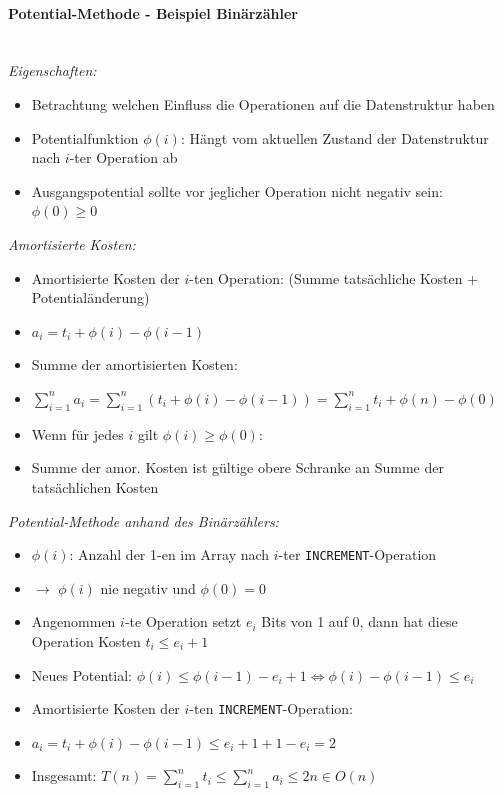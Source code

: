 \documentclass[
    ngerman,
    color=3b,
    dark_mode,
    load_common, %
    summary,
    boxarc,
]{tuda_summary}
\begin{document}
\pagebreak

\paragraph{Potential-Methode - Beispiel Binärzähler}\mbox{}\vspace{1em}\\

\textit{Eigenschaften:}
\begin{itemize}
    \item Betrachtung welchen Einfluss die Operationen auf die Datenstruktur haben
    \item Potentialfunktion $\phi(i)$: Hängt vom aktuellen Zustand der Datenstruktur nach $i$-ter Operation ab
    \item Ausgangspotential sollte vor jeglicher Operation nicht negativ sein: $\phi(0) \geq 0$
\end{itemize}

\textit{Amortisierte Kosten:}
\begin{itemize}
    \item Amortisierte Kosten der $i$-ten Operation: (Summe tatsächliche Kosten + Potentialänderung)
    \item[] $a_i = t_i + \phi(i) - \phi(i-1)$
    \item Summe der amortisierten Kosten:
    \item[] $\sum^n_{i=1} a_i = \sum^n_{i=1} (t_i + \phi(i) - \phi(i - 1)) = \sum^n_{i=1} t_i + \phi(n) - \phi(0)$
    \item Wenn für jedes $i$ gilt $\phi(i) \geq \phi(0)$:
    \item[] Summe der amor. Kosten ist gültige obere Schranke an Summe der tatsächlichen Kosten
\end{itemize}

\textit{Potential-Methode anhand des Binärzählers:}
\begin{itemize}
    \item $\phi(i)$: Anzahl der 1-en im Array nach $i$-ter \texttt{INCREMENT}-Operation
    \item[] $\rightarrow$ $\phi(i)$ nie negativ und $\phi(0) = 0$
    \item Angenommen $i$-te Operation setzt $e_i$ Bits von 1 auf 0, dann hat diese Operation Kosten $t_i \leq e_i + 1$
    \item Neues Potential: $\phi(i) \leq \phi(i-1) - e_i + 1 \Leftrightarrow \phi(i) - \phi(i-1) \leq e_i$
    \item Amortisierte Kosten der $i$-ten \texttt{INCREMENT}-Operation:
    \item[] $a_i = t_i + \phi(i) - \phi(i-1) \leq e_i + 1 + 1 - e_i = 2$
    \item Insgesamt: $T(n) = \sum^n_{i=1} t_i \leq \sum^n_{i=1} a_i \leq 2n \in O(n)$
\end{itemize}

\clearpage
\end{document}
